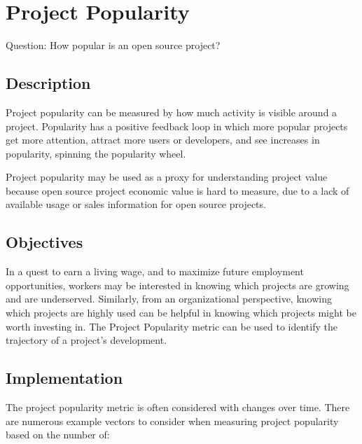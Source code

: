\hypertarget{project-popularity}{%
\section{Project Popularity}\label{project-popularity}}

Question: How popular is an open source project?

\hypertarget{description}{%
\subsection{Description}\label{description}}

Project popularity can be measured by how much activity is visible
around a project. Popularity has a positive feedback loop in which more
popular projects get more attention, attract more users or developers,
and see increases in popularity, spinning the popularity wheel.

Project popularity may be used as a proxy for understanding project
value because open source project economic value is hard to measure, due
to a lack of available usage or sales information for open source
projects.

\hypertarget{objectives}{%
\subsection{Objectives}\label{objectives}}

In a quest to earn a living wage, and to maximize future employment
opportunities, workers may be interested in knowing which projects are
growing and are underserved. Similarly, from an organizational
perspective, knowing which projects are highly used can be helpful in
knowing which projects might be worth investing in. The Project
Popularity metric can be used to identify the trajectory of a project's
development.

\hypertarget{implementation}{%
\subsection{Implementation}\label{implementation}}

The project popularity metric is often considered with changes over
time. There are numerous example vectors to consider when measuring
project popularity based on the number of:

